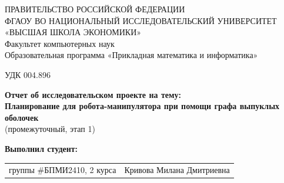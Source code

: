 \begin{titlepage}
\newpage

{
\begin{center}
ПРАВИТЕЛЬСТВО РОССИЙСКОЙ ФЕДЕРАЦИИ\\
ФГАОУ ВО НАЦИОНАЛЬНЫЙ ИССЛЕДОВАТЕЛЬСКИЙ УНИВЕРСИТЕТ\\
«ВЫСШАЯ ШКОЛА ЭКОНОМИКИ»
\\
\bigskip
Факультет компьютерных наук\\
Образовательная программа «Прикладная математика и информатика»
\end{center}
}

\vspace{2em}
УДК 004.896 %
\vspace{4em}

\begin{center}
{\bf Отчет об исследовательском проекте на тему:}\\
{\bf Планирование для робота-манипулятора при помощи графа выпуклых оболочек}\\
(промежуточный, этап 1)
\end{center}

\vspace{2em}

{\bf Выполнил студент: \vspace{2mm}}

{
\begin{tabular}{l@{\hskip 1.5cm}l}
группы \#БПМИ2410, 2 курса & Кривова Милана Дмитриевна \\
\end{tabular}}



\end{titlepage}

